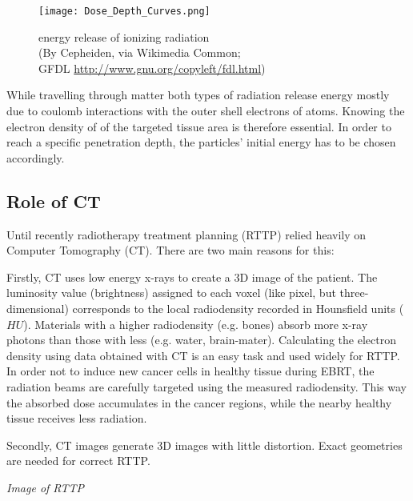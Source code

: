 \begin{figure}[!h]
	\centering
	\texttt{[image: Dose\_Depth\_Curves.png]}
	\caption{energy release of ionizing radiation \\(By Cepheiden, via Wikimedia Common;\\ GFDL \url{http://www.gnu.org/copyleft/fdl.html})}
	\label{fig:bragg}
\end{figure}

While travelling through matter both types of radiation release energy mostly due to coulomb interactions with the outer shell electrons of atoms.
Knowing the electron density of of the targeted tissue area is therefore essential. In order to reach a specific penetration depth, the particles' initial energy has to be chosen accordingly.

\clearpage
\subsection{Role of CT}

Until recently radiotherapy treatment planning (RTTP) relied heavily on Computer Tomography (CT). There are two main reasons for this:

Firstly, CT uses low energy x-rays to create a 3D image of the patient. The luminosity value (brightness) assigned to each voxel (like pixel, but three-dimensional) corresponds to
the local radiodensity recorded in Hounsfield units ($HU$). Materials with a higher radiodensity (e.g. bones) absorb more x-ray photons than those with less (e.g. water, brain-mater).
Calculating the electron density using data obtained with CT is an easy task and used widely for RTTP. \cite{Constantinou2012, Schneider1996}
In order not to induce new cancer cells in healthy tissue during EBRT, the radiation beams are carefully targeted using the measured radiodensity. 
This way the absorbed dose accumulates in the cancer regions, while the nearby healthy tissue receives less radiation.

Secondly, CT images generate 3D images with little distortion. Exact geometries are needed for correct RTTP. %

\vspace{4cm}
\textit{Image of RTTP}
\vspace{2cm}

